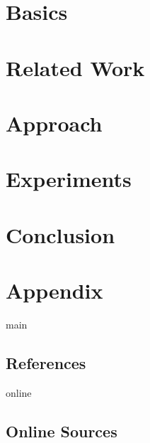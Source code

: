 \documentclass[11pt,a4paper]{report}
\begin{document}
    \chapter{Basics}
    \label{ch:2_basics}
    


    \chapter{Related Work}
    \label{ch:3_related_work}
    


    \chapter{Approach}
    \label{ch:4_approach}
    


    \chapter{Experiments}
    \label{ch:5_experiments}
    


    \chapter{Conclusion}
    \label{ch:6_conclusion}
    


    \appendix
    \chapter{Appendix}
    \label{ch:a_appendix}
    

    \newpage

    

    \begin{btSect}{main}
        \section*{References}
        \btPrintCited
    \end{btSect}

    \begin{btSect}{online}
        \section*{Online Sources}
        \btPrintCited
    \end{btSect}
\end{document}
